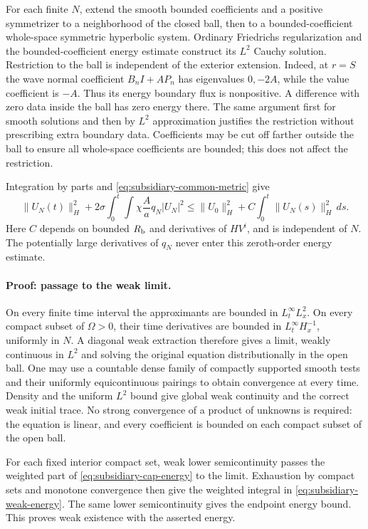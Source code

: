 For each finite $N$, extend the smooth bounded coefficients and a positive
symmetrizer to a neighborhood of the closed ball, then to a bounded-coefficient
whole-space symmetric hyperbolic system. Ordinary Friedrichs regularization
and the bounded-coefficient energy estimate construct its $L^2$ Cauchy
solution. Restriction to the ball is independent of the exterior extension.
Indeed, at $r=S$ the wave normal coefficient $B_nI+AP_n$ has eigenvalues
$0,-2A$, while the value coefficient is $-A$. Thus its energy boundary flux
is nonpositive. A difference with zero data inside the ball has zero energy
there. The same argument first for smooth solutions and then by $L^2$
approximation justifies the restriction without prescribing extra boundary
data. Coefficients may be cut off farther outside the ball to ensure all
whole-space coefficients are bounded; this does not affect the restriction.

Integration by parts and \eqref{eq:subsidiary-common-metric} give
\begin{equation}
 \|U_N(t)\|_H^2+
 2\sigma\int_0^t\!\int\chi\frac Aa q_N|U_N|^2
 \le\|U_0\|_H^2+C\int_0^t\|U_N(s)\|_H^2\,ds .
 \label{eq:subsidiary-cap-energy}
\end{equation}
Here $C$ depends on bounded $R_{\rm b}$ and derivatives of $HV^i$, and is
independent of $N$. The potentially large derivatives of $q_N$ never enter
this zeroth-order energy estimate.

\paragraph{Proof: passage to the weak limit.}
On every finite time interval the approximants are bounded in
$L^\infty_tL^2_x$. On every compact subset of $\Omega>0$, their time
derivatives are bounded in $L^\infty_tH^{-1}_x$, uniformly in $N$.
A diagonal weak extraction therefore gives a limit, weakly continuous in
$L^2$ and solving the original equation distributionally in the open ball.
One may use a countable dense family of compactly supported smooth tests and
their uniformly equicontinuous pairings to obtain convergence at every time.
Density and the uniform $L^2$ bound give global weak continuity and the
correct weak initial trace. No strong convergence of a product of unknowns
is required: the equation is linear, and every coefficient is bounded on
each compact subset of the open ball.

For each fixed interior compact set, weak lower semicontinuity passes the
weighted part of \eqref{eq:subsidiary-cap-energy} to the limit. Exhaustion
by compact sets and monotone convergence then give the weighted integral in
\eqref{eq:subsidiary-weak-energy}. The same lower semicontinuity gives the
endpoint energy bound. This proves weak existence with the asserted energy.

